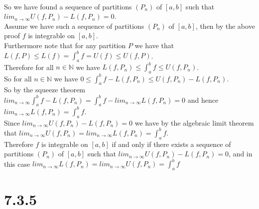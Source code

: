 \documentclass{article}
\begin{document}
\begin{center}
    \\So we have found a sequence of partitions $(P_n)$ of $[a, b]$ such that $lim_{n\rightarrow\infty} U(f, P_n) - L(f, P_n) = 0$.
    \break
    \\Assume we have such a sequence of partitions $(P_n)$ of $[a, b]$, then by the above proof $f$ is integrable on $[a, b]$.
    \\Furthermore note that for any partition $P$ we have that $L(f, P)\leq L(f) =\int _a^b f = U(f)\leq U(f, P)$.
    \\Therefore for all $n\in\mathbb{N}$ we have $L(f, P_n)\leq\int _a^b f\leq U(f, P_n)$.
    \\So for all $n\in\mathbb{N}$ we have $0\leq\int _a^b f - L(f, P_n)\leq U(f, P_n) - L(f, P_n)$.
    \\So by the squeeze theorem $lim_{n\rightarrow\infty}\int _a^b f - L(f, P_n) = \int _a^b f - lim_{n\rightarrow\infty} L(f, P_n) = 0$ and hence $lim_{n\rightarrow\infty} L(f, P_n) =\int _a^b f$.
    \\Since $lim_{n\rightarrow\infty} U(f, P_n) - L(f, P_n) = 0$ we have by the algebraic limit theorem that $lim_{n\rightarrow\infty} U(f, P_n) = lim_{n\rightarrow\infty} L(f, P_n) =\int _a^b f$.
    \break
    \\Therefore $f$ is integrable on $[a, b]$ if and only if there exists a sequence of partitions $(P_n)$ of $[a, b]$ such that $lim_{n\rightarrow\infty} U(f, P_n) - L(f, P_n) = 0$, and in this case $lim_{n\rightarrow\infty} L(f, P_n) = lim_{n\rightarrow\infty} U(f, P_n) =\int _a^b f$ \qedsymbol
\end{center}


\newpage
\section*{7.3.5}
\end{document}
